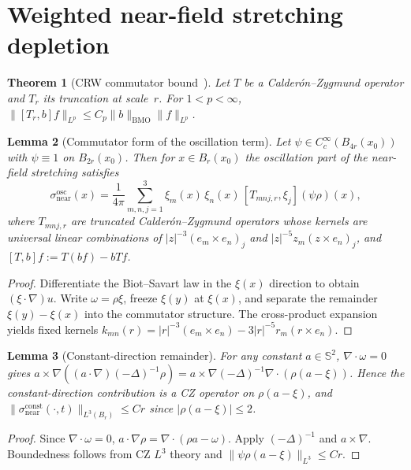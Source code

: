\documentclass[12pt, reqno]{amsart}
\newtheorem{theorem}{Theorem}[section]
\newtheorem{lemma}[theorem]{Lemma}
\theoremstyle{definition}
\theoremstyle{remark}
\numberwithin{equation}{section}
\newcommand{\Sbb}{\mathbb{S}}
\DeclareMathOperator{\BMO}{BMO}
\begin{document}
\section{Weighted near-field stretching depletion}\label{sec:nearfield}

\begin{theorem}[CRW commutator bound~{\cite{CRW1976}}]\label{thm:CRW}
Let $T$ be a Calder\'on--Zygmund operator and $T_r$ its truncation at
scale~$r$.  For $1<p<\infty$,
$\|[T_r,b]f\|_{L^p}\le C_p\|b\|_{\BMO}\|f\|_{L^p}$.
\end{theorem}

\begin{lemma}[Commutator form of the oscillation term]\label{lem:comm-form}
Let $\psi\in C_c^\infty(B_{4r}(x_0))$ with $\psi\equiv 1$ on
$B_{2r}(x_0)$.  Then for $x\in B_r(x_0)$ the oscillation part of the
near-field stretching satisfies
\begin{equation}\label{eq:comm-form}
\sigma_{\mathrm{near}}^{\mathrm{osc}}(x)
=\frac{1}{4\pi}
\sum_{m,n,j=1}^3 \xi_m(x)\,\xi_n(x)\,[T_{mnj,r},\xi_j](\psi\rho)(x),
\end{equation}
where $T_{mnj,r}$ are truncated Calder\'on--Zygmund operators whose
kernels are universal linear combinations of
$|z|^{-3}(e_m\times e_n)_j$ and $|z|^{-5}z_m(z\times e_n)_j$,
and $[T,b]f:=T(bf)-bTf$.
\end{lemma}
\begin{proof}
Differentiate the Biot--Savart law in the $\xi(x)$ direction to obtain
$(\xi\cdot\nabla)u$.  Write $\omega=\rho\xi$, freeze $\xi(y)$ at
$\xi(x)$, and separate the remainder $\xi(y)-\xi(x)$ into the
commutator structure.  The cross-product expansion yields fixed
kernels $k_{mn}(r)=|r|^{-3}(e_m\times e_n)-3|r|^{-5}r_m(r\times e_n)$.
\end{proof}

\begin{lemma}[Constant-direction remainder]\label{lem:const-dir}
For any constant $a\in\Sbb^2$, $\nabla\cdot\omega=0$ gives
$a\times\nabla((a\cdot\nabla)(-\Delta)^{-1}\rho)
=a\times\nabla(-\Delta)^{-1}\nabla\cdot(\rho(a-\xi))$.
Hence the constant-direction contribution is a CZ operator on
$\rho(a-\xi)$, and
$\|\sigma_{\mathrm{near}}^{\mathrm{const}}(\cdot,t)\|_{L^3(B_r)}\le Cr$
since $|\rho(a-\xi)|\le 2$.
\end{lemma}
\begin{proof}
Since $\nabla\cdot\omega=0$, $a\cdot\nabla\rho=\nabla\cdot(\rho a-\omega)$.
Apply $(-\Delta)^{-1}$ and $a\times\nabla$.  Boundedness follows from
CZ $L^3$ theory and $\|\psi\rho(a-\xi)\|_{L^3}\le C r$.
\end{proof}
\end{document}
